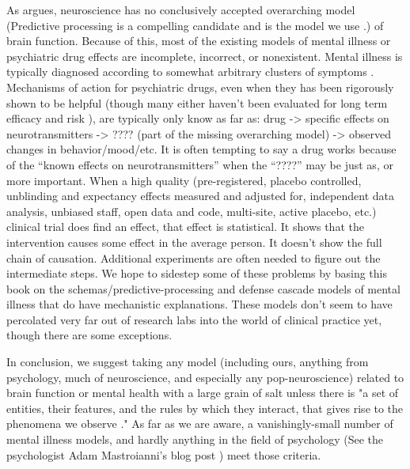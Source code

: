 \documentclass[12pt,letterpaper]{book}
\begin{document}
As \textcite{hoelNeuroscience} argues, neuroscience has no conclusively accepted overarching model (Predictive processing is a compelling candidate and is the model we use \cite{clark2015surfing}.) of brain function. Because of this, most of the existing models of mental illness or psychiatric drug effects are incomplete, incorrect, or nonexistent. Mental illness is typically diagnosed according to somewhat arbitrary clusters of symptoms \cite{apaDSM}. Mechanisms of action for psychiatric drugs, even when they has been rigorously shown to be helpful (though many either haven’t been evaluated for long term efficacy and risk \cite{leuchtDecline}), are typically only know as far as: drug -> specific effects on neurotransmitters -> ???? (part of the missing overarching model) -> observed changes in behavior/mood/etc. It is often tempting to say a drug works because of the “known effects on neurotransmitters” when the “????” may be just as, or more important. When a high quality (pre-registered, placebo controlled, unblinding and expectancy effects measured and adjusted for, independent data analysis, unbiased staff, open data and code, multi-site, active placebo, etc.) clinical trial does find an effect, that effect is statistical. It shows that the intervention causes some effect in the average person. It doesn’t show the full chain of causation. Additional experiments are often needed to figure out the intermediate steps. We hope to sidestep some of these problems by basing this book on the schemas/predictive-processing and defense cascade models of mental illness that do have mechanistic explanations. These models don't seem to have percolated very far out of research labs into the world of clinical practice yet, though there are some exceptions.

In conclusion, we suggest taking any model (including ours, anything from psychology, much of neuroscience, and especially any pop-neuroscience) related to brain function or mental health with a large grain of salt unless there is "a set of entities, their features, and the rules by which they interact, that gives rise to the phenomena we observe \cite{mechanisticModels}." As far as we are aware, a vanishingly-small number of mental illness models, and hardly anything in the field of psychology (See the psychologist Adam Mastroianni's blog post \textcite{MastroianniPsychology}) meet those criteria.
\end{document}
